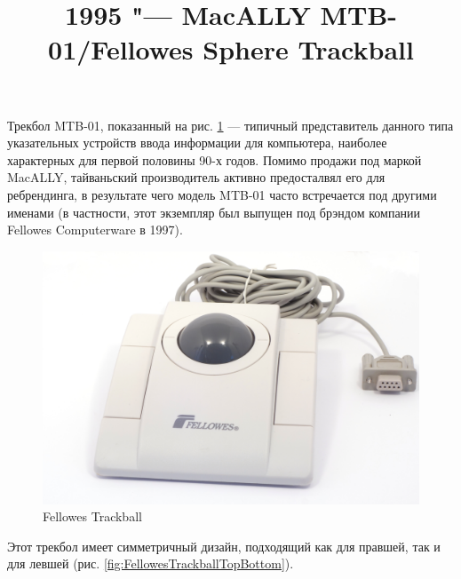 \documentclass[11pt, a4paper]{article}
\begin{document}
\title{1995 "--- MacALLY MTB-01/Fellowes Sphere Trackball}
\date{}
\maketitle
{}
Трекбол MTB-01, показанный на рис. \ref{fig:FellowesTrackballPic} — типичный представитель данного типа указательных устройств ввода информации для компьютера, наиболее характерных для первой половины 90-х годов. Помимо продажи под маркой MacALLY, тайваньский производитель активно предосталвял его для ребрендинга, в результате чего модель MTB-01 часто встречается под другими именами (в частности, этот экземпляр был выпущен под брэндом компании Fellowes Computerware в 1997).

\begin{figure}[h]
    \centering
    \includegraphics[scale=0.5]{1995_fellowes_trackball/pic_30.jpg}
    \caption{Fellowes Trackball}
    \label{fig:FellowesTrackballPic}
\end{figure}

Этот трекбол имеет симметричный дизайн, подходящий как для правшей, так и для левшей (рис. \ref{fig:FellowesTrackballTopBottom}). 
\end{document}
